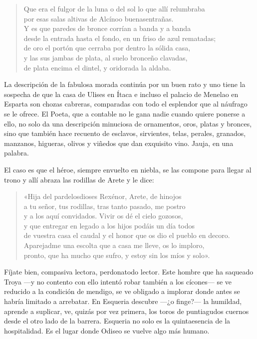 \documentclass[11pt,a4paper]{article}
\begin{document}
\begin{verse}
Que era el fulgor de la luna o del sol lo que allí relumbraba\\
por esas salas altivas de Alcínoo buenasentrañas.\\
Y es que paredes de bronce corrían a banda y a banda\\
desde la entrada hasta el fondo, en un friso de azul rematadas;\\
de oro el portón que cerraba por dentro la sólida casa,\\
y las sus jambas de plata, al suelo bronceño clavadas,\\
de plata encima el dintel, y oridorada la aldaba.
\end{verse}

La descripción de la fabulosa morada continúa por un buen rato y uno tiene la sospecha de que la casa de Ulises en Ítaca e incluso el palacio de Menelao en Esparta son chozas cabreras, comparadas con todo el esplendor que al náufrago se le ofrece. El Poeta, que a contable no le gana nadie cuando quiere ponerse a ello, no solo da una descripción minuciosa de ornamentos, oros, platas y bronces, sino que también hace recuento de esclavos, sirvientes, telas, perales, granados, manzanos, higueras, olivos y viñedos que dan exquisito vino. Jauja, en una palabra.

El caso es que el héroe, siempre envuelto en niebla, se las compone para llegar al trono y allí abraza las rodillas de Arete y le dice:

\begin{verse}
«Hija del pardelosdioses Rexénor, Arete, de hinojos\\
a tu señor, tus rodillas, tras tanto pasado, me postro\\
y a los aquí convidados. Vivir os dé el cielo gozosos,\\
y que entregar en legado a los hijos podáis un día todos\\
de vuestra casa el caudal y el honor que os dio el pueblo en decoro.\\
Aparejadme una escolta que a casa me lleve, os lo imploro,\\
pronto, que ha mucho que sufro, y estoy sin los míos y solo».
\end{verse}

Fíjate bien, compasiva lectora, perdonatodo lector. Este hombre que ha saqueado Troya ---y no contento con ello intentó robar también a los cícones--- se ve reducido a la condición de mendigo, se ve obligado a implorar donde antes se habría limitado a arrebatar. En Esqueria descubre ---¿o finge?--- la humildad, aprende a suplicar, ve, quizás por vez primera, los toros de puntiagudos cuernos desde el otro lado de la barrera. Esqueria no solo es la quintaesencia de la hospitalidad. Es el lugar donde Odiseo se vuelve algo más humano.
\end{document}

